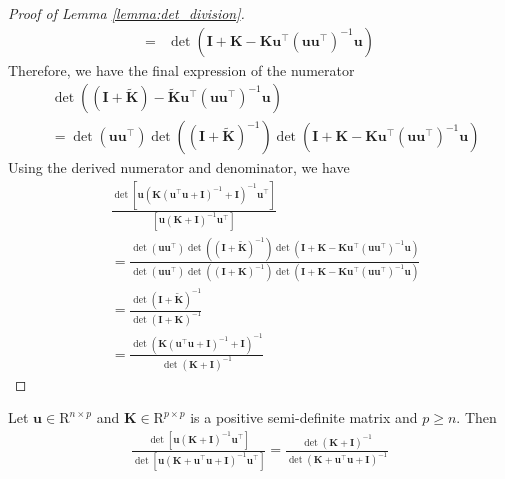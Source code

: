 \begin{proof}[Proof of Lemma \ref{lemma:det_division}]
\begin{align}
    = &  \det \left( \mathbf{I} + \mathbf{K} - \mathbf{K} \mathbf{u}^\top (\mathbf{u} \mathbf{u}^\top)^{-1}  \mathbf{u} \right)
\end{align}
Therefore, we have the final expression of the numerator  
\begin{align}
    &\det \left( (\mathbf{I} + \widetilde{\mathbf{K}}) - \widetilde{\mathbf{K}}\mathbf{u}^\top (\mathbf{u} \mathbf{u}^\top)^{-1} \mathbf{u}\right) 
    \\
    &= \det (\mathbf{u} \mathbf{u}^\top) \det \left((\mathbf{I}+\widetilde{\mathbf{K}})^{-1}\right) \det \left( \mathbf{I} + \mathbf{K} - \mathbf{K} \mathbf{u}^\top (\mathbf{u} \mathbf{u}^\top)^{-1}  \mathbf{u} \right)
\end{align}
Using the derived numerator and denominator, we have 
\begin{align}
    & \frac{\det [\mathbf{u}\left(\mathbf{K}(\mathbf{u}^\top\mathbf{u}+\mathbf{I})^{-1} + \mathbf{I}\right)^{-1}\mathbf{u}^\top]}{[\mathbf{u}\left(\mathbf{K} + \mathbf{I}\right)^{-1}\mathbf{u}^\top]} 
    \\
    &= \frac{\det (\mathbf{u} \mathbf{u}^\top) \det \left((\mathbf{I}+\widetilde{\mathbf{K}})^{-1}\right) \det \left( \mathbf{I} + \mathbf{K} - \mathbf{K} \mathbf{u}^\top (\mathbf{u} \mathbf{u}^\top)^{-1}  \mathbf{u} \right)}{\det (\mathbf{u} \mathbf{u}^\top) \det \left((\mathbf{I}+\mathbf{K})^{-1}\right) \det \left(\mathbf{I} + \mathbf{K} - \mathbf{K}\mathbf{u}^\top (\mathbf{u} \mathbf{u}^\top)^{-1} \mathbf{u}\right)}\\
    &=\frac{\det (\mathbf{I}+\widetilde{\mathbf{K}})^{-1}}{\det (\mathbf{I}+\mathbf{K})^{-1}} \\
    &=\frac{\det \left(\mathbf{K}(\mathbf{u}^\top\mathbf{u}+\mathbf{I})^{-1} + \mathbf{I}\right)^{-1}}{\det \left(\mathbf{K} + \mathbf{I}\right)^{-1}}   
    \end{align} 
\end{proof}
\begin{subcorollary}
\label{corollary:det_divison_corollary}
Let $\mathbf{u} \in \mathrm{R}^{n \times p}$ and $\mathbf{K} \in \mathrm{R}^{p \times p}$ is a positive semi-definite matrix and $p \ge n$. Then 
\begin{align}
    \frac{\det[\mathbf{u}(\mathbf{K}+\mathbf{I})^{-1} \mathbf{u}^\top]}{\det [\mathbf{u}(\mathbf{K}+ \mathbf{u}^\top \mathbf{u} + \mathbf{I})^{-1} \mathbf{u}^\top]} = \frac{\det (\mathbf{K}+\mathbf{I})^{-1}}{\det(\mathbf{K}+\mathbf{u}^\top \mathbf{u}+\mathbf{I})^{-1}}
\end{align}
\end{subcorollary}
